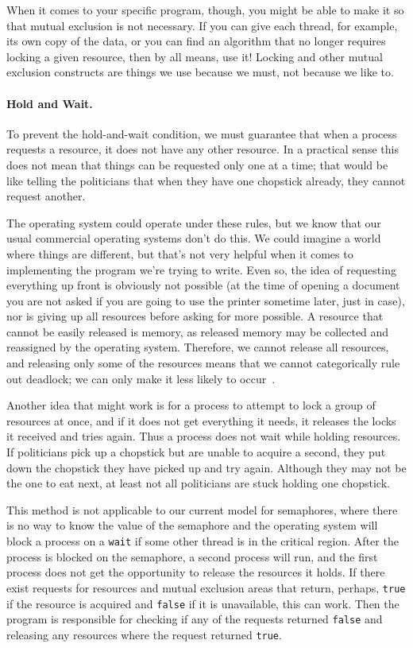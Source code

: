 When it comes to your specific program, though, you might be able to make it so that mutual exclusion is not necessary. If you can give each thread, for example, its own copy of the data,  or you can find an algorithm that no longer requires locking a given resource, then by all means, use it! Locking and other mutual exclusion constructs are things we use because we must, not because we like to.

\paragraph{Hold and Wait.} To prevent the hold-and-wait condition, we must guarantee that when a process requests a resource, it does not have any other resource. In a practical sense this does not mean that things can be requested only one at a time; that would be like telling the politicians that when they have one chopstick already, they cannot request another.

The operating system could operate under these rules, but we know that our usual commercial operating systems don't do this. We could imagine a world where things are different, but that's not very helpful when it comes to implementing the program we're trying to write. Even so, the idea of requesting everything up front is obviously not possible (at the time of opening a document you are not asked if you are going to use the printer sometime later, just in case), nor is giving up all resources before asking for more possible. A resource that cannot be easily released is memory, as released memory may be collected and reassigned by the operating system. Therefore, we cannot release all resources, and releasing only some of the resources means that we cannot categorically rule out deadlock; we can only make it less likely to occur~\cite{mte241}.

Another idea that might work is for a process to attempt to lock a group of resources at once, and if it does not get everything it needs, it releases the locks it received and tries again. Thus a process does not wait while holding resources. If politicians pick up a chopstick but are unable to acquire a second, they put down the chopstick they have picked up and try again. Although they may not be the one to eat next, at least not all politicians are stuck holding one chopstick.

This method is not applicable to our current model for semaphores, where there is no way to know the value of the semaphore and the operating system will block a process on a \texttt{wait} if some other thread is in the critical region. After the process is blocked on the semaphore, a second process will run, and the first process does not get the opportunity to release the resources it holds. If there exist requests for resources and mutual exclusion areas that return, perhaps, \texttt{true} if the resource is acquired and \texttt{false} if it is unavailable, this can work. Then the program is responsible for checking if any of the requests returned \texttt{false} and releasing any resources where the request returned \texttt{true}.

